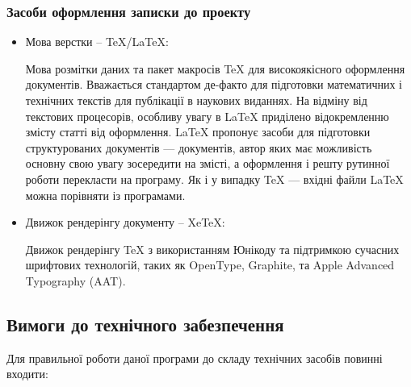 \begin{itemize}[label=\Large$\diamond$]
\end{itemize}

\subsubsection{Засоби оформлення записки до проекту}
\begin{itemize}[label=\Large$\diamond$]\itemsep1em
  \item Мова верстки -- TeX/LaTeX:

    Мова розмітки даних та пакет макросів TeX для високоякісного оформлення документів. Вважається стандартом де-факто для підготовки математичних і технічних текстів для публікації в наукових виданнях.
    На відміну від текстових процесорів, особливу увагу в LaTeX приділено відокремленню змісту статті від оформлення. LaTeX пропонує засоби для підготовки структурованих документів — документів, автор яких має можливість основну свою увагу зосередити на змісті, а оформлення і решту рутинної роботи перекласти на програму. Як і у випадку TeX — вхідні файли LaTeX можна порівняти із програмами.

  \item Движок рендерінгу документу -- XeTeX:

    Движок рендерінгу TeX з використанням Юнікоду та підтримкою сучасних шрифтових технологій, таких як OpenType, Graphite, та Apple Advanced Typography (AAT).
\end{itemize}

\subsection{Вимоги до технічного забезпечення}

Для правильної роботи даної програми до складу технічних засобів повинні входити:

